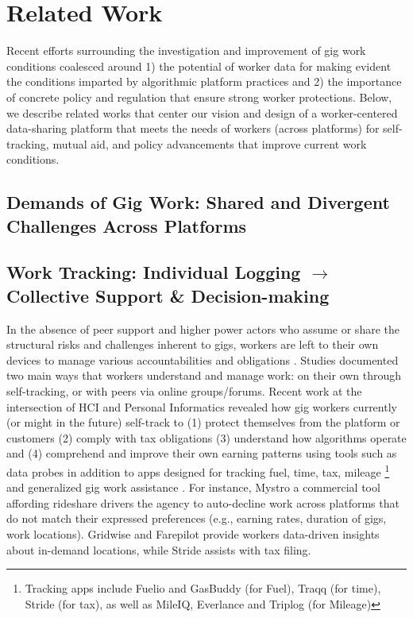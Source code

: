 \section{Related Work}
\label{Related_Work}
{Recent efforts} surrounding the investigation and improvement of gig work conditions coalesced around 1) the potential of worker data for making evident the conditions imparted by algorithmic platform practices and 2) the importance of concrete policy and regulation that ensure strong worker protections. 
Below, we describe related works that center our vision {and design} of a worker-centered data-sharing platform that meets {the needs of workers (across platforms)} for self-tracking, mutual aid, and policy advancements that improve current work conditions.


\subsection{{Demands of Gig Work: Shared and Divergent Challenges Across Platforms}}


\subsection{{Work Tracking: Individual Logging $\rightarrow$ Collective Support \& Decision-making}}
In the absence of peer support and higher power actors who assume or share the structural risks and challenges inherent to gigs, workers are left to their own devices to manage {various} accountabilities {and obligations} \cite{consent, indie, accountable}. 
Studies documented two main ways that workers understand and manage work: on their own through self-tracking, or with peers via online groups/forums. 
Recent work at the intersection of HCI and Personal Informatics revealed how gig workers currently (or might in the future) self-track to (1) protect themselves from the platform \cite{privacy} or customers \cite{visibility, sousveillance} (2) comply with tax obligations \cite{tax_lives, taxing} (3) understand how algorithms operate \cite{sousveillance, zhang2023stakeholder} and (4) comprehend and improve their own earning patterns \cite{zhang2023stakeholder, accountable, supporting} using tools such as data probes {in addition to apps designed for tracking fuel, time, tax, mileage \footnote{Tracking apps include Fuelio and GasBuddy (for Fuel), Traqq (for time), Stride (for tax), as well as MileIQ, Everlance and Triplog (for Mileage)} and generalized gig work assistance \cite{accountable}. For instance, Mystro a commercial tool affording rideshare drivers the agency to auto-decline work across platforms that do not match their expressed preferences (e.g., earning rates, duration of gigs, work locations). 
Gridwise and Farepilot provide workers data-driven insights about in-demand locations, while Stride assists with tax filing. } 

